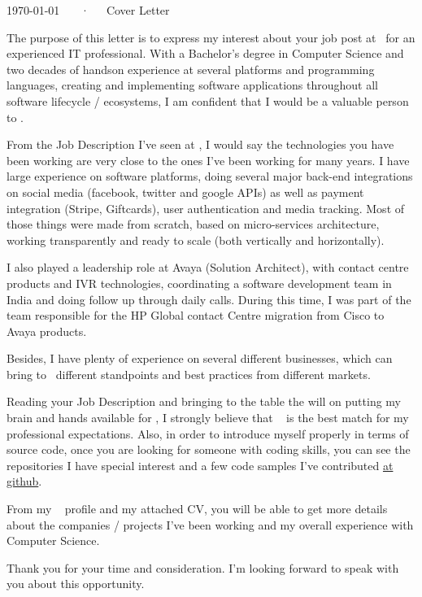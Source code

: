 \documentclass[11pt, a4paper]{awesome-cv}
\begin{document}
\makecvheader

\makecvfooter
  {\today}
  {\completename~~~·~~~Cover Letter}
  {}

\makelettertitle

\begin{cvletter}

The purpose of this letter is to express my interest about your job post at \website~for an experienced IT professional.
With a Bachelor’s degree in Computer Science and two decades of hands­on experience at several platforms
and programming languages, creating and implementing software applications throughout all software lifecycle / ecosystems,
I am confident that I would be a valuable person to \company.


From the Job Description I've seen at \website, I would say the technologies you have been working are very close to the ones I've been
working for many years. I have large experience on software platforms, doing several major back-end integrations
on social media (facebook, twitter and google APIs) as well as payment integration (Stripe, Giftcards), user authentication and media tracking.
Most of those things were made from scratch, based on micro-services architecture, working
transparently and ready to scale (both vertically and horizontally).

I also played a leadership role at Avaya (Solution Architect),
with contact centre products and IVR technologies, coordinating a software development team in India and doing follow up through daily calls.
During this time, I was part of the team responsible for the
HP Global contact Centre migration from Cisco to Avaya products.

Besides, I have plenty of experience on several different businesses, which can bring to \company~different standpoints
and best practices from different markets.


Reading your Job Description and bringing to the table the will on putting my brain and hands available for \company,
I strongly believe that \company~ is the best match for my professional expectations.
Also, in order to introduce myself properly in terms of source code, once you are looking for someone
with coding skills, you can see the repositories I have special interest and a few code samples
I've contributed \href{https://github.com/glauciom}{at github}.

From my \website~ profile and my attached CV, you will be able to get more details
about the companies / projects I've been working and my overall experience with Computer Science.

Thank you for your time and consideration. I’m looking forward to speak with you about this opportunity.

\end{cvletter}
\makeletterclosing
\end{document}
